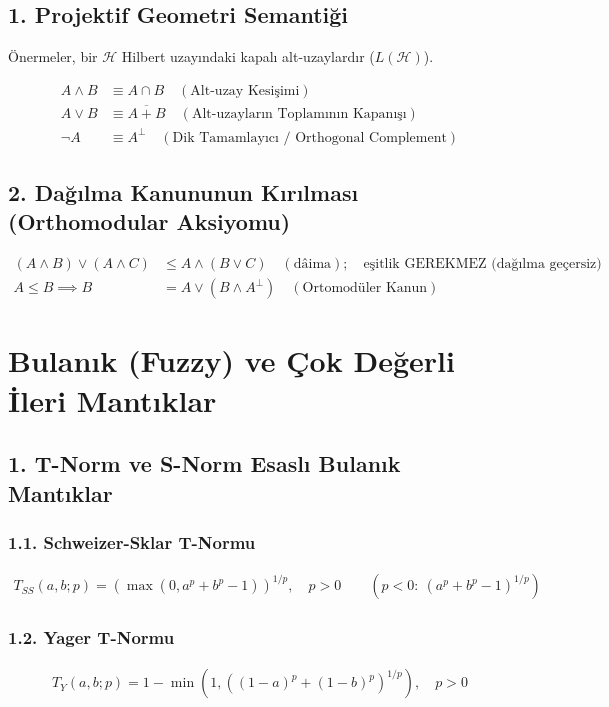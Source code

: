 \documentclass[11pt, a4paper]{article}
\begin{document}
\subsection{1. Projektif Geometri Semantiği}
Önermeler, bir $\mathcal{H}$ Hilbert uzayındaki kapalı alt-uzaylardır ($L(\mathcal{H})$).

\begin{align}
A \land B &\equiv A \cap B \quad (\text{Alt-uzay Kesişimi}) \\
A \lor B &\equiv \overline{A + B} \quad (\text{Alt-uzayların Toplamının Kapanışı}) \\
\neg A &\equiv A^{\bot} \quad (\text{Dik Tamamlayıcı / Orthogonal Complement})
\end{align}

\subsection{2. Dağılma Kanununun Kırılması (Orthomodular Aksiyomu)}
\begin{align}
(A \land B) \lor (A \land C) &\le A \land (B \lor C) \quad (\text{dâima}); \quad \text{eşitlik GEREKMEZ (dağılma geçersiz)} \\
A \le B \implies B &= A \lor (B \land A^{\bot}) \quad (\text{Ortomodüler Kanun})
\end{align}

\section{Bulanık (Fuzzy) ve Çok Değerli İleri Mantıklar}

\subsection{1. T-Norm ve S-Norm Esaslı Bulanık Mantıklar}

\subsubsection{1.1. Schweizer-Sklar T-Normu}
\begin{align}
T_{SS}(a, b; p) = \left( \max(0, a^p + b^p - 1) \right)^{1/p}, \quad p > 0 \qquad \left( p < 0: \ (a^p + b^p - 1)^{1/p} \right)
\end{align}

\subsubsection{1.2. Yager T-Normu}
\begin{align}
T_{Y}(a, b; p) = 1 - \min\left(1, \left((1-a)^p + (1-b)^p\right)^{1/p}\right), \quad p > 0
\end{align}
\end{document}
